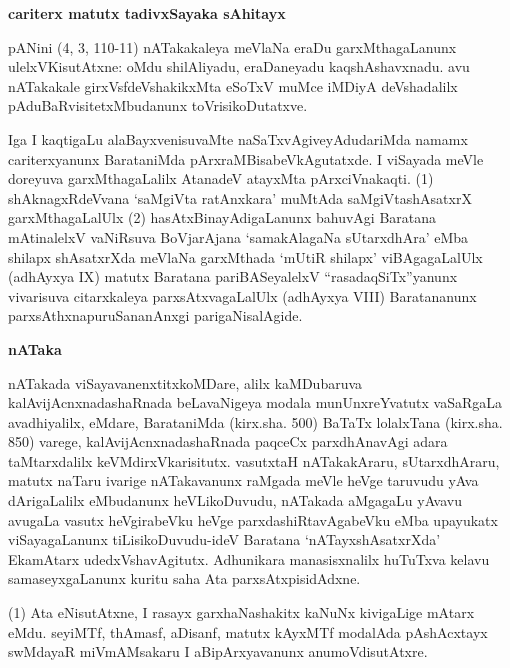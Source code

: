 \newpage

\begin{center}
{\Large\bf cariterx matutx tadivxSayaka sAhitayx}
\end{center}

pANini (4, 3, 110-11) nATakakaleya meVlaNa eraDu garxMthagaLanunx ulelxVKisutAtxne: oMdu shilAliyadu, eraDaneyadu kaqshAshavxnadu. avu nATakakale girxVsfdeVshakikxMta eSoTxV muMce iMDiyA deVshadalilx pAduBaRvisitetxMbudanunx toVrisikoDutatxve.

Iga I kaqtigaLu alaBayxvenisuvaMte naSaTxvAgiveyAdudariMda namamx cariterxyanunx BarataniMda pArxraMBisabeVkAgutatxde. I viSayada meVle doreyuva garxMthagaLalilx AtanadeV atayxMta pArxciVnakaqti. (1) shAknagxRdeVvana `saMgiVta ratAnxkara' muMtAda saMgiVtashAsatxrX garxMthagaLalUlx (2) hasAtxBinayAdigaLanunx bahuvAgi Baratana mAtinalelxV vaNiRsuva BoVjarAjana `samakAlagaNa sUtarxdhAra' eMba shilapx shAsatxrXda meVlaNa garxMthada `mUtiR shilapx' viBAgagaLalUlx (adhAyxya {\rm IX}) matutx Baratana pariBASeyalelxV ``rasadaqSiTx''yanunx vivarisuva citarxkaleya parxsAtxvagaLalUlx (adhAyxya {\rm VIII}) Baratananunx parxsAthxnapuruSananAnxgi parigaNisalAgide.

\bigskip
\begin{center}
{\Large\bf nATaka}
\end{center}

nATakada viSayavanenxtitxkoMDare, alilx kaMDubaruva kalAvijAcnxnadashaRnada beLavaNigeya modala munUnxreYvatutx vaSaRgaLa avadhiyalilx, eMdare, BarataniMda (kirx.sha. 500) BaTaTx lolalxTana (kirx.sha. 850) varege, kalAvijAcnxnadashaRnada paqceCx parxdhAnavAgi adara taMtarxdalilx keVMdirxVkarisitutx. vasutxtaH nATakakAraru, sUtarxdhAraru, matutx naTaru ivarige nATakavanunx raMgada meVle heVge taruvudu yAva dArigaLalilx eMbudanunx heVLikoDuvudu, nATakada aMgagaLu yAvavu avugaLa vasutx heVgirabeVku heVge parxdashiRtavAgabeVku eMba upayukatx viSayagaLanunx tiLisikoDuvudu-ideV Baratana `nATayxshAsatxrXda' EkamAtarx udedxVshavAgitutx. Adhunikara manasisxnalilx huTuTxva kelavu samaseyxgaLanunx kuritu saha Ata parxsAtxpisidAdxne.

(1) Ata eNisutAtxne, I rasayx garxhaNashakitx kaNuNx kivigaLige mAtarx eMdu. seyiMTf, thAmasf, aDisanf, matutx kAyxMTf modalAda pAshAcxtayx swMdayaR miVmAMsakaru I aBipArxyavanunx anumoVdisutAtxre.

